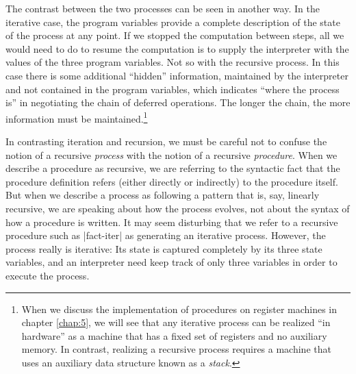 The contrast between the two processes can be seen in another way.  In
the iterative case, the program variables provide a complete
description of the state of the process at any point.  If we stopped
the computation between steps, all we would need to do to resume the
computation is to supply the interpreter with the values of the three
program variables.  Not so with the recursive process.  In this case
there is some additional ``hidden'' information, maintained by the
interpreter and not contained in the program variables, which
indicates ``where the process is'' in negotiating the chain of
deferred operations.  The longer the chain, the more information must
be maintained.\footnote{When we discuss the implementation of
  procedures on register machines in chapter \ref{chap:5}, we will see
  that any iterative process can be realized ``in hardware'' as a
  machine that has a fixed set of registers and no auxiliary memory.
  In contrast, realizing a recursive process requires a machine that
  uses an auxiliary data structure known as a \textit{stack}.}

In contrasting iteration and recursion, we must be careful not to
confuse the notion of a recursive \textit{process} with the notion of
a recursive \textit{procedure}.  When we describe a procedure as
recursive, we are referring to the syntactic fact that the procedure
definition refers (either directly or indirectly) to the procedure
itself.  But when we describe a process as following a pattern that
is, say, linearly recursive, we are speaking about how the process
evolves, not about the syntax of how a procedure is written.  It may
seem disturbing that we refer to a recursive procedure such as
\scheme|fact-iter| as generating an iterative process.  However, the
process really is iterative: Its state is captured completely by its
three state variables, and an interpreter need keep track of only
three variables in order to execute the process.

